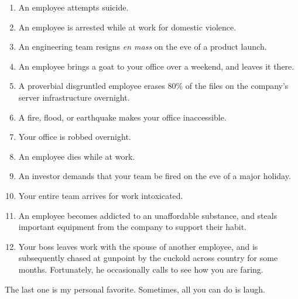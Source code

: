 \begin{enumerate}
\item An employee attempts suicide.
\item An employee is arrested while at work for domestic violence.
\item An engineering team resigns \textit{en mass} on the eve of a product launch.
\item An employee brings a goat to your office over a weekend, and leaves it there.
\item A proverbial disgruntled employee erases 80\% of the files on the company's server infrastructure overnight.
\item A fire, flood, or earthquake makes your office inaccessible.
\item Your office is robbed overnight.
\item An employee dies while at work.
\item An investor demands that your team be fired on the eve of a major holiday.
\item Your entire team arrives for work intoxicated.
\item An employee becomes addicted to an unaffordable substance, and steals important equipment from the company to support their habit.
\item Your boss leaves work with the spouse of another employee, and is subsequently chased at gunpoint by the cuckold across country for some months. Fortunately, he occasionally calls to see how you are faring.
\end{enumerate}

The last one is my personal favorite. Sometimes, all you can do is laugh.

\newpage
\thispagestyle{empty}





